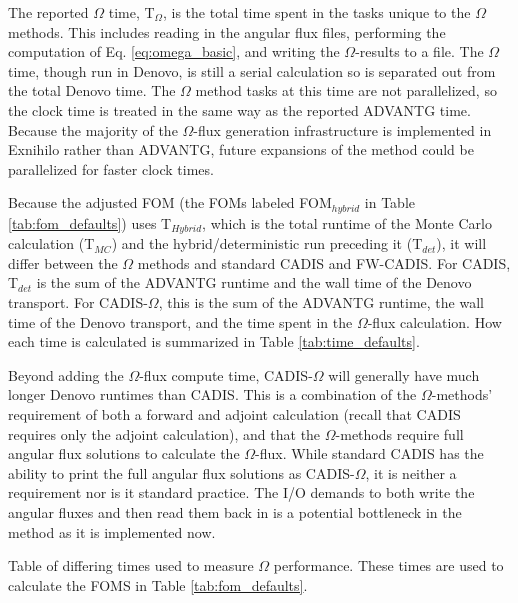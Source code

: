 The reported $\Omega$ time, T$_{\Omega}$, is the total
time spent in the tasks unique to the $\Omega$ methods. This includes reading
in the angular flux files, performing the computation of Eq.
\eqref{eq:omega_basic}, and writing the $\Omega$-results to a file.
The $\Omega$ time,
though run in Denovo, is still a serial calculation so is separated out from the
total Denovo time. The $\Omega$ method tasks at this time are not
parallelized, so the clock time is treated in the same way as the reported
ADVANTG time. Because the majority of the $\Omega$-flux generation
infrastructure is implemented in Exnihilo rather than ADVANTG, future expansions
of the method could be parallelized for faster clock times.

Because the adjusted FOM (the FOMs labeled FOM$_{hybrid}$ in Table
\ref{tab:fom_defaults}) uses T$_{Hybrid}$, which is the total runtime of the
Monte Carlo calculation (T$_{MC}$) and the hybrid/deterministic run preceding it
(T$_{det}$), it will differ between
the $\Omega$ methods and standard CADIS and FW-CADIS. For CADIS, T$_{det}$ is
the sum of the ADVANTG runtime and the wall time of the Denovo transport. For
CADIS-$\Omega$, this is the sum of the ADVANTG runtime, the wall time of the
Denovo transport, and the time spent in the $\Omega$-flux calculation. How each
time is calculated is summarized in Table \ref{tab:time_defaults}.

Beyond
adding the $\Omega$-flux compute time, CADIS-$\Omega$ will generally have much
longer Denovo runtimes than CADIS. This is a combination of the $\Omega$-methods'
requirement of both a forward and adjoint calculation (recall that CADIS
requires only the adjoint calculation), and that the $\Omega$-methods require
full angular flux solutions to calculate the $\Omega$-flux. While standard CADIS
has the ability to print the full angular flux solutions as CADIS-$\Omega$, it
is neither a requirement nor is it standard practice. The I/O demands to both write
the angular fluxes and then read them back in is a potential bottleneck in the
method as it is implemented now.

\begin{table}[h!]
  \centering
  
  \caption[Table of differing times used to measure $\Omega$ performance.]{
    Table of differing times used to measure $\Omega$ performance. These times
    are used to calculate the FOMS in Table \ref{tab:fom_defaults}. }
  \label{tab:time_defaults}
\end{table}

